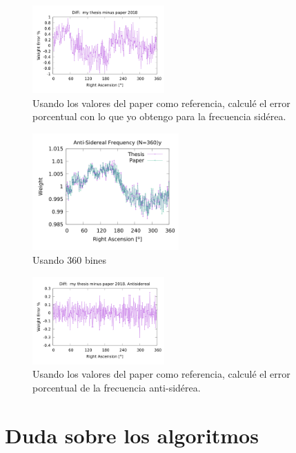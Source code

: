 \begin{figure}[H]
	\centering
	\includegraphics[width=0.45\textwidth]{sidereal_my_and_paper_in_360_error.png}
	\caption{Usando los valores del paper como referencia, calculé el error porcentual con lo que yo obtengo para la frecuencia sidérea.}
	\label{fig:error_360_sid}
\end{figure}



\begin{figure}[H]
	\centering
	\includegraphics[width=0.5\textwidth]{anti_my_and_paper_in_360.png}
	\caption{Usando 360 bines}
	\label{fig:anti_360}
\end{figure}


\begin{figure}[H]
	\centering
	\includegraphics[width=0.45\textwidth]{anti_my_and_paper_in_360_error.png}
	\caption{Usando los valores del paper como referencia, calculé el error porcentual de la frecuencia anti-sidérea.}
	\label{fig:error_360_anti}
\end{figure}



\section{Duda sobre los algoritmos}


